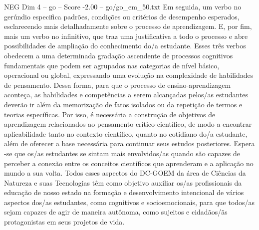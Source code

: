 \begin{textsample}{NEG Dim 4 – go – Score -2.00 – go/go\_em\_50.txt}
Em seguida, um verbo no gerúndio especifica padrões, condições ou critérios de desempenho esperados, esclarecendo mais detalhadamente sobre o processo de aprendizagem.
E, por fim, mais um verbo no infinitivo, que traz uma justificativa a todo o processo e abre possibilidades de ampliação do conhecimento do/a estudante.
Esses três verbos obedecem a uma determinada gradação ascendente de processos cognitivos fundamentais que podem ser agrupados nas categorias de nível básico, operacional ou global, expressando uma evolução na complexidade de habilidades de pensamento.
Dessa forma, para que o processo de ensino-aprendizagem aconteça, as habilidades e competências a serem alcançadas pelos/as estudantes deverão ir além da memorização de fatos isolados ou da repetição de termos e teorias específicas.
Por isso, é necessária a construção de objetivos de aprendizagem relacionados ao pensamento crítico-científico, de modo a encontrar aplicabilidade tanto no contexto científico, quanto no cotidiano do/a estudante, além de oferecer a base necessária para continuar seus estudos posteriores.
Espera -se que os/as estudantes se sintam mais envolvidos/as quando são capazes de perceber a conexão entre os conceitos científicos que aprenderam e a aplicação no mundo a sua volta.
Todos esses aspectos do DC-GOEM da área de Ciências da Natureza e suas Tecnologias têm como objetivo auxiliar os/as profissionais da educação de nosso estado na formação e desenvolvimento intencional de vários aspectos dos/as estudantes, como cognitivos e socioemocionais, para que todos/as sejam capazes de agir de maneira autônoma, como sujeitos e cidadãos/ãs protagonistas em seus projetos de vida.

\end{textsample}
